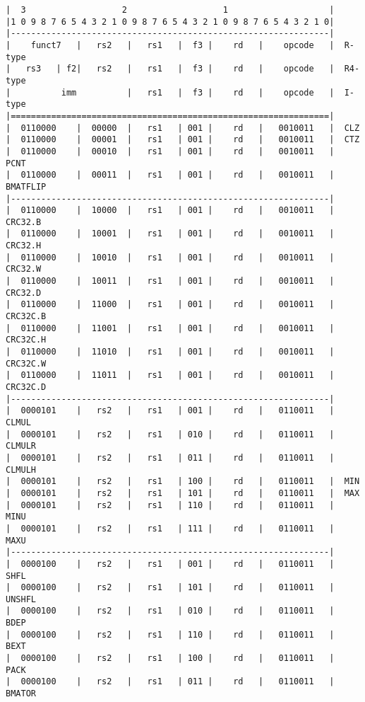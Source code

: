 \begin{minipage}{\linewidth}
\begin{verbatim}
|  3                   2                   1                    |
|1 0 9 8 7 6 5 4 3 2 1 0 9 8 7 6 5 4 3 2 1 0 9 8 7 6 5 4 3 2 1 0|
|---------------------------------------------------------------|
|    funct7   |   rs2   |   rs1   |  f3 |    rd   |    opcode   |  R-type
|   rs3   | f2|   rs2   |   rs1   |  f3 |    rd   |    opcode   |  R4-type
|          imm          |   rs1   |  f3 |    rd   |    opcode   |  I-type
|===============================================================|
|  0110000    |  00000  |   rs1   | 001 |    rd   |   0010011   |  CLZ
|  0110000    |  00001  |   rs1   | 001 |    rd   |   0010011   |  CTZ
|  0110000    |  00010  |   rs1   | 001 |    rd   |   0010011   |  PCNT
|  0110000    |  00011  |   rs1   | 001 |    rd   |   0010011   |  BMATFLIP
|---------------------------------------------------------------|
|  0110000    |  10000  |   rs1   | 001 |    rd   |   0010011   |  CRC32.B
|  0110000    |  10001  |   rs1   | 001 |    rd   |   0010011   |  CRC32.H
|  0110000    |  10010  |   rs1   | 001 |    rd   |   0010011   |  CRC32.W
|  0110000    |  10011  |   rs1   | 001 |    rd   |   0010011   |  CRC32.D
|  0110000    |  11000  |   rs1   | 001 |    rd   |   0010011   |  CRC32C.B
|  0110000    |  11001  |   rs1   | 001 |    rd   |   0010011   |  CRC32C.H
|  0110000    |  11010  |   rs1   | 001 |    rd   |   0010011   |  CRC32C.W
|  0110000    |  11011  |   rs1   | 001 |    rd   |   0010011   |  CRC32C.D
|---------------------------------------------------------------|
|  0000101    |   rs2   |   rs1   | 001 |    rd   |   0110011   |  CLMUL
|  0000101    |   rs2   |   rs1   | 010 |    rd   |   0110011   |  CLMULR
|  0000101    |   rs2   |   rs1   | 011 |    rd   |   0110011   |  CLMULH
|  0000101    |   rs2   |   rs1   | 100 |    rd   |   0110011   |  MIN
|  0000101    |   rs2   |   rs1   | 101 |    rd   |   0110011   |  MAX
|  0000101    |   rs2   |   rs1   | 110 |    rd   |   0110011   |  MINU
|  0000101    |   rs2   |   rs1   | 111 |    rd   |   0110011   |  MAXU
|---------------------------------------------------------------|
|  0000100    |   rs2   |   rs1   | 001 |    rd   |   0110011   |  SHFL
|  0000100    |   rs2   |   rs1   | 101 |    rd   |   0110011   |  UNSHFL
|  0000100    |   rs2   |   rs1   | 010 |    rd   |   0110011   |  BDEP
|  0000100    |   rs2   |   rs1   | 110 |    rd   |   0110011   |  BEXT
|  0000100    |   rs2   |   rs1   | 100 |    rd   |   0110011   |  PACK
|  0000100    |   rs2   |   rs1   | 011 |    rd   |   0110011   |  BMATOR

\end{verbatim}
\end{minipage}
